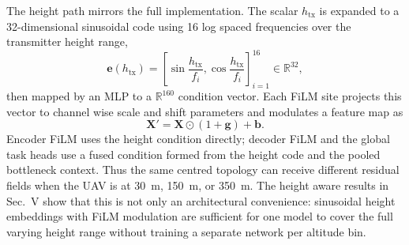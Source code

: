 \documentclass[journal]{IEEEtran}
\begin{document}
The height path mirrors the full implementation. The scalar
\(h_{\mathrm{tx}}\) is expanded to a 32-dimensional sinusoidal code using
16 log spaced frequencies over the transmitter height range,
\begin{equation}
\mathbf{e}(h_{\mathrm{tx}})
=
\left[
\sin\!\frac{h_{\mathrm{tx}}}{f_i},
\cos\!\frac{h_{\mathrm{tx}}}{f_i}
\right]_{i=1}^{16}
\in\mathbb{R}^{32},
\label{eq:height-embed-paper}
\end{equation}
then mapped by an MLP to a \(\mathbb{R}^{160}\) condition vector. Each FiLM
site projects this vector to channel wise scale and shift parameters and
modulates a feature map as
\begin{equation}
\mathbf{X}'=\mathbf{X}\odot(1+\mathbf{g})+\mathbf{b}.
\label{eq:film-paper}
\end{equation}
Encoder FiLM uses the height condition directly; decoder FiLM and the global
task heads use a fused condition formed from the height code and the pooled
bottleneck context. Thus the same centred topology can receive different
residual fields when the UAV is at \SI{30}{m}, \SI{150}{m}, or
\SI{350}{m}. The height aware results in Sec.~V show that this is not only an
architectural convenience: sinusoidal height embeddings with FiLM modulation are
sufficient for one model to cover the full varying height range without
training a separate network per altitude bin.
\end{document}
